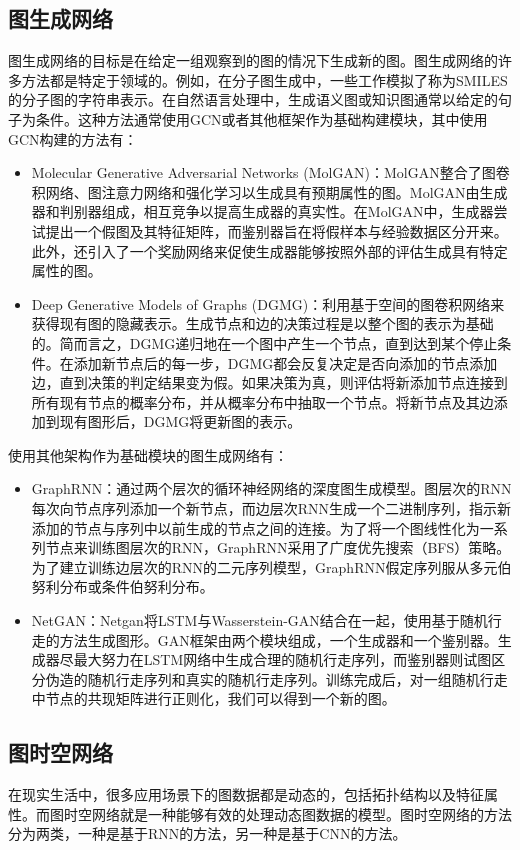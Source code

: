 \subsection{图生成网络}
图生成网络的目标是在给定一组观察到的图的情况下生成新的图。图生成网络的许多方法都是特定于领域的。例如，在分子图生成中，一些工作模拟了称为SMILES的分子图的字符串表示。在自然语言处理中，生成语义图或知识图通常以给定的句子为条件。这种方法通常使用GCN或者其他框架作为基础构建模块，其中使用GCN构建的方法有：
\begin{itemize}
    \item Molecular Generative Adversarial Networks (MolGAN)\cite{de2018molgan}：MolGAN整合了图卷积网络、图注意力网络和强化学习以生成具有预期属性的图。MolGAN由生成器和判别器组成，相互竞争以提高生成器的真实性。在MolGAN中，生成器尝试提出一个假图及其特征矩阵，而鉴别器旨在将假样本与经验数据区分开来。此外，还引入了一个奖励网络来促使生成器能够按照外部的评估生成具有特定属性的图。
    \item Deep Generative Models of Graphs (DGMG)\cite{li2018learning}：利用基于空间的图卷积网络来获得现有图的隐藏表示。生成节点和边的决策过程是以整个图的表示为基础的。简而言之，DGMG递归地在一个图中产生一个节点，直到达到某个停止条件。在添加新节点后的每一步，DGMG都会反复决定是否向添加的节点添加边，直到决策的判定结果变为假。如果决策为真，则评估将新添加节点连接到所有现有节点的概率分布，并从概率分布中抽取一个节点。将新节点及其边添加到现有图形后，DGMG将更新图的表示。
\end{itemize}
使用其他架构作为基础模块的图生成网络有：
\begin{itemize}
    \item GraphRNN\cite{2018GraphRNN}：通过两个层次的循环神经网络的深度图生成模型。图层次的RNN每次向节点序列添加一个新节点，而边层次RNN生成一个二进制序列，指示新添加的节点与序列中以前生成的节点之间的连接。为了将一个图线性化为一系列节点来训练图层次的RNN，GraphRNN采用了广度优先搜索（BFS）策略。为了建立训练边层次的RNN的二元序列模型，GraphRNN假定序列服从多元伯努利分布或条件伯努利分布。
    \item NetGAN\cite{2018NetGAN}：Netgan将LSTM与Wasserstein-GAN结合在一起，使用基于随机行走的方法生成图形。GAN框架由两个模块组成，一个生成器和一个鉴别器。生成器尽最大努力在LSTM网络中生成合理的随机行走序列，而鉴别器则试图区分伪造的随机行走序列和真实的随机行走序列。训练完成后，对一组随机行走中节点的共现矩阵进行正则化，我们可以得到一个新的图。
\end{itemize}

\subsection{图时空网络}
在现实生活中，很多应用场景下的图数据都是动态的，包括拓扑结构以及特征属性。而图时空网络就是一种能够有效的处理动态图数据的模型。图时空网络的方法分为两类，一种是基于RNN的方法，另一种是基于CNN的方法。

